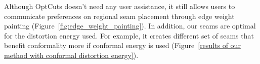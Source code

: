 Although OptCuts doesn't need any user assistance, it still allows users to communicate preferences on regional seam placement through edge weight painting (Figure~\ref{fig:edge_weight_painting}).
In addition, our seams are optimal for the distortion energy used. For example, it creates different set of seams that benefit conformality more if conformal energy is used (Figure~\ref{results of our method with conformal distortion energy}).